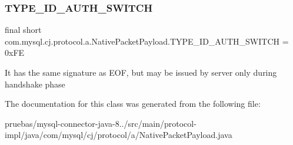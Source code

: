 \subsubsection{\texorpdfstring{T\+Y\+P\+E\+\_\+\+I\+D\+\_\+\+A\+U\+T\+H\+\_\+\+S\+W\+I\+T\+CH}{TYPE\_ID\_AUTH\_SWITCH}}
{\footnotesize\ttfamily final short com.\+mysql.\+cj.\+protocol.\+a.\+Native\+Packet\+Payload.\+T\+Y\+P\+E\+\_\+\+I\+D\+\_\+\+A\+U\+T\+H\+\_\+\+S\+W\+I\+T\+CH = 0x\+FE\hspace{0.3cm}{\ttfamily [static]}}

It has the same signature as E\+OF, but may be issued by server only during handshake phase 

The documentation for this class was generated from the following file\+:\begin{DoxyCompactItemize}
\item 
pruebas/mysql-\/connector-\/java-\/8../src/main/protocol-\/impl/java/com/mysql/cj/protocol/a/Native\+Packet\+Payload.\+java\end{DoxyCompactItemize}
